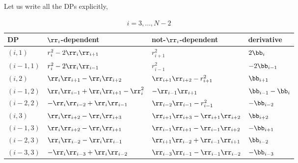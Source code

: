 Let us write all the DPs explicitly,
\begin{table}[ht]
  \caption{$i=3,\ldots,N-2$}
  \centering
  \begin{tabular}{|p{2cm}|p{3cm}|p{4cm}|p{2cm}|}
\hline
    DP			& $\rr_i$-dependent 	& not-$\rr_i$-dependent & derivative \\
   \hline 
    $(i,1)$ 	& $r_i^2-2\rr_i\rr_{i+1}$ 	
    		& $r_{i+1}^2$ 
		& $2\bb_i$ \\
    \hline
    $(i-1,1)$ 	& $r_{i}^2-2\rr_{i}\rr_{i-1}$	
    		& $r_{i-1}^2$ 
		& $-2\bb_{i-1}$\\
    \hline
    $(i,2)$ 	& $\rr_i\rr_{i+1}-\rr_i\rr_{i+2}$  
    		& $\rr_{i+1}\rr_{i+2}-r_{i+1}^2$ 
		& $\bb_{i+1}$ \\
    \hline
    $(i-1,2)$ 	& $\rr_i\rr_{i-1}+\rr_i\rr_{i+1}-\rr_{i}^2$ 
    		& $-\rr_{i-1}\rr_{i+1}$ 
    		& $\bb_{i-1}-\bb_i$ \\
    \hline
    $(i-2,2)$ 	& $-\rr_i\rr_{i-2}+\rr_i\rr_{i-1}$ 
    		& $\rr_{i-2}\rr_{i-1}-r_{i-1}^2$ 
		& $-\bb_{i-2}$\\
    \hline
    $(i,3)$		& $\rr_i\rr_{i+2}-\rr_{i}\rr_{i+3}$	
    			& $\rr_{i+1}\rr_{i+3}-\rr_{i+1}\rr_{i+2}$ 
			& $\bb_{i+2}$ \\
    \hline
    $(i-1,3)$		& $\rr_i\rr_{i+2}-\rr_i\rr_{i+1} $   	
    			& $\rr_{i-1}\rr_{i+1}-\rr_{i-1}\rr_{i+2}$ 
			& $-\bb_{i+1}$ \\
    \hline
    $(i-2,3)$		& $\rr_i\rr_{i-2}-\rr_i\rr_{i-1}$ 	
    			& $\rr_{i+1}\rr_{i-2}+\rr_{i-1}\rr_{i+1}$ 
			& $\bb_{i-2}$ \\
    \hline
    $(i-3,3)$		& $-\rr_i\rr_{i-3}+\rr_i\rr_{i-2}$ 
    			& $\rr_{i-3}\rr_{i-1}-\rr_{i-1}\rr_{i-2}$
			& $-\bb_{i-3}$	\\
\hline
  \end{tabular}
\end{table}
\clearpage

